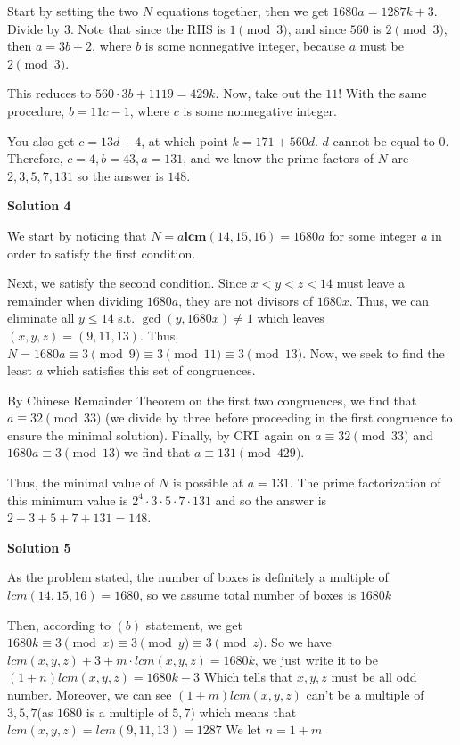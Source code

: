 \begin{enumerate}
 Start by setting the two $N$ equations together, then we get $1680a=1287k+3$. Divide by $3$. Note that since the RHS is $1\pmod{3}$, and since $560$ is $2\pmod{3}$, then $a=3b+2$, where $b$ is some nonnegative integer, because $a$ must be $2\pmod{3}$.

 This reduces to $560 \cdot 3b + 1119 = 429k$. Now, take out the $11!$ With the same procedure, $b=11c-1$, where $c$ is some nonnegative integer.

 You also get $c=13d+4$, at which point $k=171+560d$. $d$ cannot be equal to $0$. Therefore, $c=4, b=43, a=131$, and we know the prime factors of $N$ are $2, 3, 5, 7, 131$ so the answer is $\boxed{148}$.

 



\textbf{Solution 4}

We start by noticing that $N = a\textbf{lcm}(14, 15, 16) = 1680a$ for some integer $a$ in order to satisfy the first condition. 

 Next, we satisfy the second condition. Since $x<y<z < 14$ must leave a remainder when dividing $1680a$, they are not divisors of $1680x$. Thus, we can eliminate all $y \le 14$ s.t. $\gcd(y, 1680x) \ne 1$ which leaves $(x, y, z) = (9, 11, 13)$. Thus, $N = 1680a \equiv 3 \pmod 9 \equiv 3 \pmod {11} \equiv 3 \pmod {13}$. Now, we seek to find the least $a$ which satisfies this set of congruences.

 By Chinese Remainder Theorem on the first two congruences, we find that $a \equiv 32 \pmod {33}$ (we divide by three before proceeding in the first congruence to ensure the minimal solution). Finally, by CRT again on $a \equiv 32 \pmod {33}$ and $1680a \equiv 3 \pmod {13}$ we find that $a \equiv 131 \pmod {429}$. 

 Thus, the minimal value of $N$ is possible at $a = 131$. The prime factorization of this minimum value is $2^4 \cdot 3 \cdot 5 \cdot 7 \cdot 131$ and so the answer is $2 + 3 + 5 + 7 + 131 = \boxed{148}$.

 


 



\textbf{Solution 5}

As the problem stated, the number of boxes is definitely a multiple of $lcm(14,15,16)=1680$, so we assume total number of boxes is $1680k$

 Then, according to $(b)$ statement, we get $1680k \equiv 3 \pmod x \equiv 3 \pmod {y} \equiv 3 \pmod {z}$. So we have $lcm(x,y,z)+3+m\cdot lcm(x,y,z)=1680k$, we just write it to be $(1+n)lcm(x,y,z)=1680k-3$ Which tells that $x,y,z$ must be all odd number. Moreover, we can see $(1+m)lcm(x,y,z)$ can't be a multiple of $3,5,7$(as $1680$ is a multiple of $5,7$) which means that $lcm(x,y,z)=lcm(9,11,13)=1287$ We let $n=1+m$


\end{enumerate}
